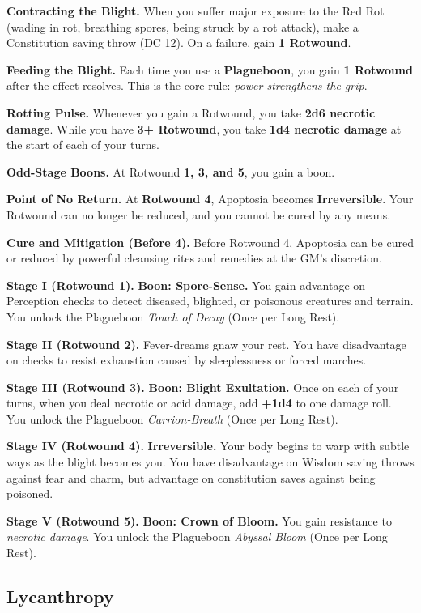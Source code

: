\documentclass{apotheosis-book}
\begin{document}
\textbf{Contracting the Blight.} When you suffer major exposure to the Red Rot (wading in rot, breathing spores, being struck by a rot attack), make a Constitution saving throw (DC 12). On a failure, gain \textbf{1 Rotwound}.

\textbf{Feeding the Blight.} Each time you use a \textbf{Plagueboon}, you gain \textbf{1 Rotwound} after the effect resolves. This is the core rule: \emph{power strengthens the grip}.

\textbf{Rotting Pulse.} Whenever you gain a Rotwound, you take \textbf{2d6 necrotic damage}. While you have \textbf{3+ Rotwound}, you take \textbf{1d4 necrotic damage} at the start of each of your turns.

\textbf{Odd-Stage Boons.} At Rotwound \textbf{1, 3, and 5}, you gain a boon.

\textbf{Point of No Return.} At \textbf{Rotwound 4}, Apoptosia becomes \textbf{Irreversible}. Your Rotwound can no longer be reduced, and you cannot be cured by any means.

\textbf{Cure and Mitigation (Before 4).} Before Rotwound 4, Apoptosia can be cured or reduced by powerful cleansing rites and remedies at the GM's discretion.

\medskip

\textbf{Stage I (Rotwound 1).} \textbf{Boon: Spore-Sense.} You gain advantage on Perception checks to detect diseased, blighted, or poisonous creatures and terrain.
You unlock the Plagueboon \emph{Touch of Decay} (Once per Long Rest).

\textbf{Stage II (Rotwound 2).} Fever-dreams gnaw your rest. You have disadvantage on checks to resist exhaustion caused by sleeplessness or forced marches.

\textbf{Stage III (Rotwound 3).} \textbf{Boon: Blight Exultation.} Once on each of your turns, when you deal necrotic or acid damage, add \textbf{+1d4} to one damage roll.
You unlock the Plagueboon \emph{Carrion-Breath} (Once per Long Rest).

\textbf{Stage IV (Rotwound 4).} \textbf{Irreversible.} Your body begins to warp with subtle ways as the blight becomes you. You have disadvantage on Wisdom saving throws against fear and charm, but advantage on constitution saves against being poisoned.

\textbf{Stage V (Rotwound 5).} \textbf{Boon: Crown of Bloom.} You gain resistance to \textit{necrotic damage}.
You unlock the Plagueboon \emph{Abyssal Bloom} (Once per Long Rest).

\subsection{Lycanthropy}
\end{document}
